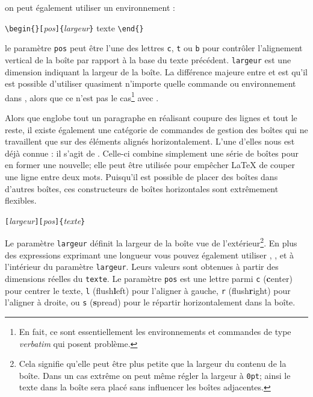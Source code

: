 \noindent on peut également utiliser un environnement :
\begin{lscommand}
\verb|\begin{|\verb|}[|\emph{pos}\verb|]{|\emph{largeur}\verb|}| texte
\verb|\end{|\verb|}|
\end{lscommand}

\noindent le paramètre \texttt{pos} peut être l'une des lettres
\texttt{c}, \texttt{t} ou \texttt{b} pour contrôler l'alignement
vertical de la boîte par rapport à la base du texte
précédent. \texttt{largeur} est une dimension indiquant la largeur de la
boîte. La différence majeure entre  et  est
qu'il est possible d'utiliser quasiment n'importe quelle commande ou
environnement dans , alors que ce n'est pas le cas\footnote{En
  fait, ce sont essentiellement les environnements et commandes de type
  \emph{verbatim} qui posent problème. \NdT} avec
.

Alors que  englobe tout un paragraphe en réalisant coupure
des lignes et tout le reste, il existe également une catégorie de
commandes de gestion des boîtes qui ne travaillent que sur des
éléments alignés horizontalement. L'une d'elles nous est déjà
connue : il s'agit de . Celle-ci combine simplement une série de
boîtes pour en former une nouvelle; elle peut être utilisée pour
empêcher \LaTeX{} de couper une ligne entre deux mots. Puisqu'il est
possible de placer des boîtes dans d'autres boîtes, ces constructeurs de
boîtes horizontales sont extrêmement flexibles.

\begin{lscommand}
\verb|[|\emph{largeur}\verb|][|\emph{pos}\verb|]{|\emph{texte}\verb|}|
\end{lscommand}

\noindent Le paramètre \texttt{largeur} définit la largeur de la boîte vue de
l'extérieur\footnote{Cela signifie qu'elle peut être plus petite que
la largeur du contenu de la boîte. Dans un cas extrême on peut même
régler la largeur à \texttt{0pt}; ainsi le texte dans la boîte
sera placé sans influencer les boîtes adjacentes.}.  En plus des
expressions exprimant une longueur vous pouvez également utiliser
, ,  et  à l'intérieur
du paramètre \texttt{largeur}. Leurs valeurs sont obtenues à partir
des dimensions réelles du \texttt{texte}. Le paramètre \texttt{pos}
est une lettre parmi \texttt{c} (\textbf{c}enter) pour centrer le
texte, \texttt{l} (flush\textbf{l}eft) pour l'aligner à gauche,
\texttt{r} (flush\textbf{r}ight) pour l'aligner à droite, ou
\texttt{s} (\textbf{s}pread) pour le répartir horizontalement dans la
boîte.

